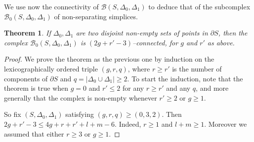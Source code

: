 \documentclass[10pt]{amsart}
\newtheorem{thm}{Theorem}[section]
\newcommand{\BB}{\mathcal{B}}
\newcommand{\De}{\Delta}
\newcommand{\del}{\partial}
\begin{document}
We use now the connectivity of $\BB(S,\De_0,\De_1)$ to deduce that of the subcomplex $\BB_0(S,\De_0,\De_1)$ of
non-separating simplices. 



\begin{thm}\label{BX}
If $\De_0,\De_1$ are two disjoint non-empty sets of points in $\del S$, then the complex
 $\BB_0(S,\De_0,\De_1)$ is $(2g+r'-3)$--connected, for $g$ and $r'$ as above.
\end{thm}



\begin{proof}
We prove the theorem as the previous one by induction on the lexicographically ordered triple $(g,r,q)$, 
where $r\ge r'$ is the number of components of $\del S$ and $q=|\De_0\cup
\De_1|\ge 2$.  
To start the induction, note that the theorem is true when $g=0$ and $r'\le 2$ for any $r\ge r'$ and any $q$, and 
more generally that the complex is non-empty whenever $r'\ge 2$ or $g\ge 1$. 



So fix $(S,\De_0,\De_1)$ satisfying $(g,r,q)\ge(0,3,2)$. 
Then $2g+r'-3\le 4g+r+r'+l+m-6$. Indeed, $r\ge 1$ and $l+m\ge 1$. Moreover we assumed that either $r\ge 3$ or $g\ge 1$. 


\end{proof}
\end{document}
